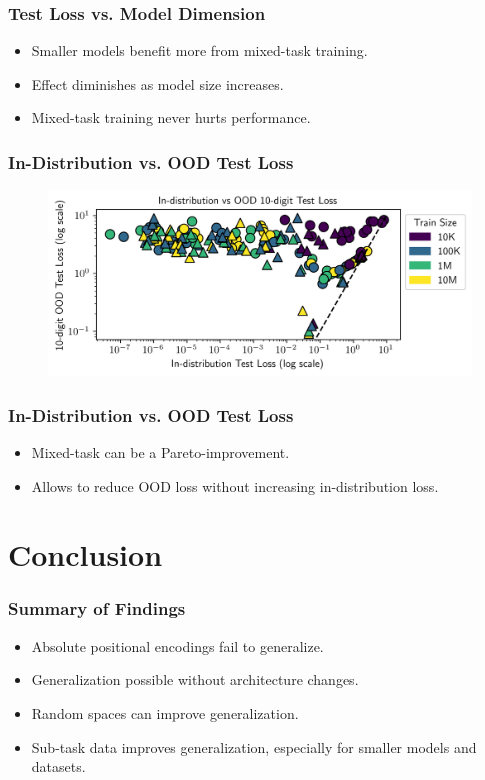 \documentclass[14pt,aspectratio=169]{beamer}
\theoremstyle{remark}
\begin{document}
\begin{frame}
    \frametitle{Test Loss vs. Model Dimension}
    \begin{itemize}
        \item Smaller models benefit more from mixed-task training.
        \item Effect diminishes as model size increases.
        \item Mixed-task training never hurts performance.
    \end{itemize}
\end{frame}

\begin{frame}
    \frametitle{In-Distribution vs. OOD Test Loss}
    \begin{figure}
        \centering
        \includegraphics[width=0.8\linewidth]{fig/subtask_overfitting.png}
    \end{figure}
\end{frame}


\begin{frame}
    \frametitle{In-Distribution vs. OOD Test Loss}
    \begin{itemize}
        \item Mixed-task can be a Pareto-improvement.
        \item Allows to reduce OOD loss without increasing in-distribution loss.
    \end{itemize}
\end{frame}


\section{Conclusion}

\begin{frame}
    \frametitle{Summary of Findings}
    \begin{itemize}
        \item Absolute positional encodings fail to generalize.
        \item Generalization possible without architecture changes.
        \item Random spaces can improve generalization.
        \item Sub-task data improves generalization, especially for smaller models and datasets.
    \end{itemize}
\end{frame}
\end{document}
